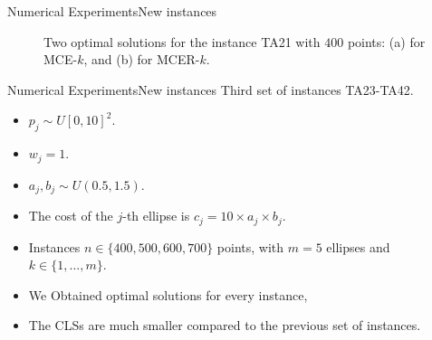 \documentclass{beamer}
\theoremstyle{definition}
\begin{document}
\begin{frame}{Numerical Experiments}{New instances}
\begin{figure}
\begin{subfigure}{.44\textwidth}
			\caption{}
			\label{fig:MCER_TA21}
		\end{subfigure}
		\caption{Two optimal solutions for the instance TA21 with $400$ points: (a) for MCE-$k$, and (b) for MCER-$k$.}
		\label{fig:TA21}
	\end{figure}
\end{frame}

\begin{frame}{Numerical Experiments}{New instances}
	Third set of instances TA23-TA42.
	\begin{itemize}
		\item $p_j \sim U[0, 10]^2$.
		\item $w_j = 1$.
		\item $a_j, b_j \sim U(0.5, 1.5)$.
		\item The cost of the $j$-th ellipse is $c_j = 10 \times a_j \times b_j$.
		\item Instances  $n\in\{400, 500, 600, 700\}$ points, with $m=5$ ellipses and $k \in \{1,\dots, m\}$.
		\item We Obtained optimal solutions for every instance,
		\item The CLSs are much smaller compared to the previous set of instances.
	\end{itemize}
\end{frame}
\end{document}
